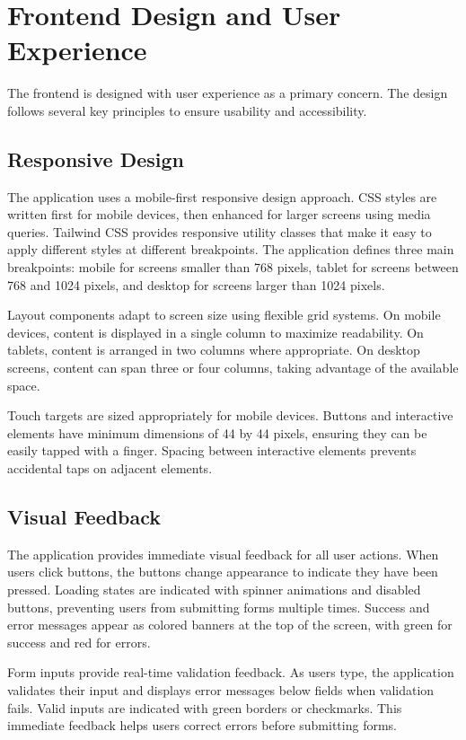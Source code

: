 \section{Frontend Design and User Experience}

The frontend is designed with user experience as a primary concern. The design follows several key principles to ensure usability and accessibility.

\subsection{Responsive Design}

The application uses a mobile-first responsive design approach. CSS styles are written first for mobile devices, then enhanced for larger screens using media queries. Tailwind CSS provides responsive utility classes that make it easy to apply different styles at different breakpoints. The application defines three main breakpoints: mobile for screens smaller than 768 pixels, tablet for screens between 768 and 1024 pixels, and desktop for screens larger than 1024 pixels.

Layout components adapt to screen size using flexible grid systems. On mobile devices, content is displayed in a single column to maximize readability. On tablets, content is arranged in two columns where appropriate. On desktop screens, content can span three or four columns, taking advantage of the available space.

Touch targets are sized appropriately for mobile devices. Buttons and interactive elements have minimum dimensions of 44 by 44 pixels, ensuring they can be easily tapped with a finger. Spacing between interactive elements prevents accidental taps on adjacent elements.

\subsection{Visual Feedback}

The application provides immediate visual feedback for all user actions. When users click buttons, the buttons change appearance to indicate they have been pressed. Loading states are indicated with spinner animations and disabled buttons, preventing users from submitting forms multiple times. Success and error messages appear as colored banners at the top of the screen, with green for success and red for errors.

Form inputs provide real-time validation feedback. As users type, the application validates their input and displays error messages below fields when validation fails. Valid inputs are indicated with green borders or checkmarks. This immediate feedback helps users correct errors before submitting forms.

